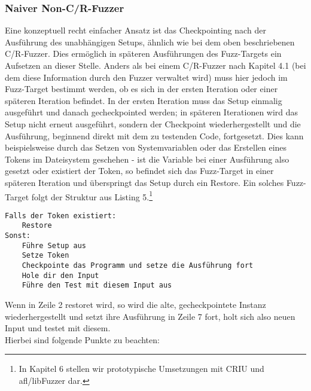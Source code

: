 \documentclass[a4paper]{article}
\begin{document}
\subsubsection{Naiver Non-C/R-Fuzzer}
Eine konzeptuell recht einfacher Ansatz ist das Checkpointing nach der Ausführung des unabhängigen Setups, ähnlich wie bei dem oben beschriebenen C/R-Fuzzer.
Dies ermöglich in späteren Ausführungen des Fuzz-Targets ein Aufsetzen an dieser Stelle.
Anders als bei einem C/R-Fuzzer nach Kapitel 4.1 (bei dem diese Information durch den Fuzzer verwaltet wird) muss hier jedoch im Fuzz-Target bestimmt werden, ob es sich in der ersten Iteration oder einer späteren Iteration befindet. 
In der ersten Iteration muss das Setup einmalig ausgeführt und danach gecheckpointed werden; in späteren Iterationen wird das Setup nicht erneut ausgeführt, sondern der Checkpoint wiederhergestellt und die Ausführung, beginnend direkt mit dem zu testenden Code, fortgesetzt.
Dies kann beispielsweise durch das Setzen von Systemvariablen oder das Erstellen eines Tokens im Dateisystem geschehen - ist die Variable bei einer Ausführung also gesetzt oder existiert der Token, so befindet sich das Fuzz-Target in einer späteren Iteration und überspringt das Setup durch ein Restore.
Ein solches Fuzz-Target folgt der Struktur aus Listing 5.\footnote{In Kapitel 6 stellen wir prototypische Umsetzungen mit CRIU und afl/libFuzzer dar.}
\begin{lstlisting}[caption=Struktur C/R-Fuzztarget für Non-C/R-Fuzzer]
Falls der Token existiert:
    Restore
Sonst:
    Führe Setup aus
    Setze Token
    Checkpointe das Programm und setze die Ausführung fort
    Hole dir den Input
    Führe den Test mit diesem Input aus
\end{lstlisting}
Wenn in Zeile 2 restoret wird, so wird die alte, gecheckpointete Instanz wiederhergestellt und setzt ihre Ausführung in Zeile 7 fort, holt sich also neuen Input und testet mit diesem.\\
Hierbei sind folgende Punkte zu beachten:
\end{document}
